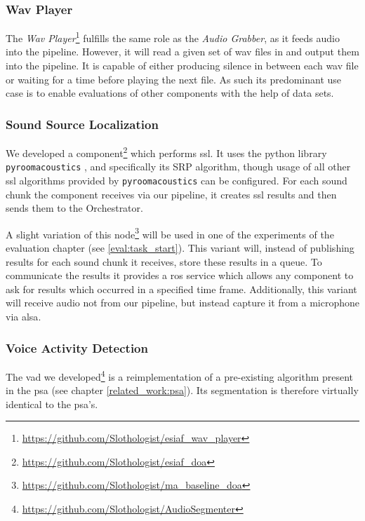 \subsubsection{Wav Player}
\label{main:components:wav}
The \textit{Wav Player}\footnote{\url{https://github.com/Slothologist/esiaf_wav_player}} fulfills the same role as the \textit{Audio Grabber}, as it feeds audio into the pipeline.
However, it will read a given set of wav files in and output them into the pipeline.
It is capable of either producing silence in between each wav file or waiting for a time before playing the next file.
As such its predominant use case is to enable evaluations of other components with the help of data sets.

\subsubsection{Sound Source Localization}
\label{main:components:ssl}
We developed a component\footnote{\url{https://github.com/Slothologist/esiaf_doa}} which performs \gls{ssl}.
It uses the python library \texttt{pyroomacoustics} \cite{pyroomacoustics}, and specifically its SRP algorithm, though usage of all other \gls{ssl} algorithms provided by \texttt{pyroomacoustics} can be configured.
For each sound chunk the component receives via our pipeline, it creates \gls{ssl} results and then sends them to the Orchestrator.

A slight variation of this node\footnote{\url{https://github.com/Slothologist/ma_baseline_doa}}  will be used in one of the experiments of the evaluation chapter (see \ref{eval:task_start}).
This variant will, instead of publishing results for each sound chunk it receives, store these results in a queue.
To communicate the results it provides a \gls{ros} service which allows any component to ask for results which occurred in a specified time frame.
Additionally, this variant will receive audio not from our pipeline, but instead capture it from a microphone via \gls{alsa}.

\subsubsection{Voice Activity Detection}
\label{main:components:vad}
The \gls{vad} we developed\footnote{\url{https://github.com/Slothologist/AudioSegmenter}} is a reimplementation of a pre-existing algorithm present in the \gls{psa} (see chapter \ref{related_work:psa}).
Its segmentation is therefore virtually identical to the \gls{psa}'s.

